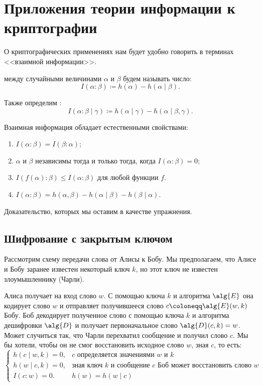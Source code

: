 \section{Приложения теории информации к криптографии}

О криптографических применениях нам будет удобно говорить в терминах <<взаимной информации>>.

\begin{definition}
     между случайными величинами $\alpha$ и $\beta$ будем называть число:
    $$
        I(\alpha : \beta) \coloneqq h(\alpha) - h(\alpha \mid \beta).
    $$
        
    Также определим :
    $$
        I(\alpha : \beta \mid \gamma) \coloneqq h(\alpha \mid \gamma) -
        h(\alpha \mid \beta, \gamma).
    $$
\end{definition}

Взаимная информация обладает естественными свойствами:
\begin{enumerate}
    \item $I(\alpha : \beta) = I(\beta : \alpha)$;
    \item $\alpha$ и $\beta$ независимы тогда и только тогда, когда $I(\alpha : \beta) = 0$;
    \item $I(f(\alpha) : \beta) \le I(\alpha : \beta)$ для любой функции $f$.
    \item $I(\alpha : \beta) = h(\alpha, \beta) - h(\alpha \mid \beta) - h(\beta \mid \alpha)$.
\end{enumerate}
Доказательство, которых мы оставим в качестве упражнения.

\subsection{Шифрование с закрытым ключом}

Рассмотрим схему передачи слова от Алисы к Бобу. Мы предполагаем, что Алисе и Бобу заранее известен
некоторый ключ $k$, но этот ключ не известен злоумышленнику (Чарли).

Алиса получает на вход слово $w$. С помощью ключа $k$ и алгоритма $\alg{E}$ она кодирует слово $w$ и
отправляет получившееся слово $c \coloneqq \alg{E}(w, k)$ Бобу. Боб декодирует полученное слово с помощью
ключа $k$ и алгоритма дешифровки $\alg{D}$ и получает первоначальное слово $\alg{D}(c, k) = w$. Может
случиться так, что Чарли перехватил сообщение и получил слово $c$. Мы бы хотели, чтобы
он не смог восстановить исходное слово $w$, зная $c$, то есть: 
$$
    \begin{cases}
        h(c \mid w, k) = 0, & \text{$c$ определяется значениями $w$ и $k$}\\
        h(w \mid c, k) = 0, & \text{зная ключ $k$ и сообщение $c$ Боб может восстановить слово $w$}\\
        I(c : w) = 0. & h(w) = h(w \mid c)
\end{cases}
$$

